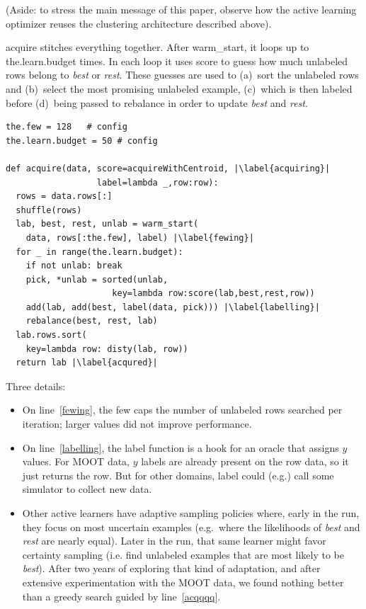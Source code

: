 \documentclass[AMA,STIX2COL]{WileyNJDv5}
\begin{document}
(Aside: to stress the main 
message of this paper, observe how the active learning optimizer reuses the 
clustering architecture described above).


\textsf{acquire} stitches everything together. After \textsf{warm\_start}, 
it loops up to \textsf{the.learn.budget} times.
In each loop it uses \textsf{score} to guess how much unlabeled rows
belong to {\em best} or {\em rest}. These guesses
are used to (a)~sort the unlabeled rows and (b)~select the most
promising unlabeled example, (c)~which is then labeled
before (d)~being passed to \textsf{rebalance} in order to
update \textit{best} and
\textit{rest}.
\begin{verbatim}
the.few = 128   # config
the.learn.budget = 50 # config

def acquire(data, score=acquireWithCentroid, |\label{acquiring}|
                  label=lambda _,row:row): 
  rows = data.rows[:]
  shuffle(rows)
  lab, best, rest, unlab = warm_start(
    data, rows[:the.few], label) |\label{fewing}|
  for _ in range(the.learn.budget):
    if not unlab: break
    pick, *unlab = sorted(unlab,
                     key=lambda row:score(lab,best,rest,row))
    add(lab, add(best, label(data, pick))) |\label{labelling}|
    rebalance(best, rest, lab)
  lab.rows.sort(
    key=lambda row: disty(lab, row))
  return lab |\label{acqured}|
\end{verbatim}
Three details:
\begin{itemize}
\item
On  line~\ref{fewing}, 
the \textsf{few} caps the number of unlabeled rows searched
 per iteration; larger values did not improve performance.
\item
On line~\ref{labelling},
the 
\textsf{label} function is 
a hook for an oracle that assigns $y$ values.
For MOOT data, $y$ labels are already present on the row data, so it just returns
the   row. But for other domains, \textsf{label} could (e.g.) call some
simulator to collect new data.
\item
Other active learners have adaptive sampling policies where, early in the run,
they focus on   most uncertain
examples (e.g.\ where the likelihoods of {\em best} and {\em rest} are nearly equal). Later in the run, that same learner  might favor  certainty sampling (i.e. find unlabeled examples that are most
likely to be {\em best}). After two years of exploring that kind of adaptation, and after extensive
experimentation with the MOOT data, we found   nothing   better than
a
greedy search guided by line~\ref{acqqqq}.
\end{itemize}
\end{document}
